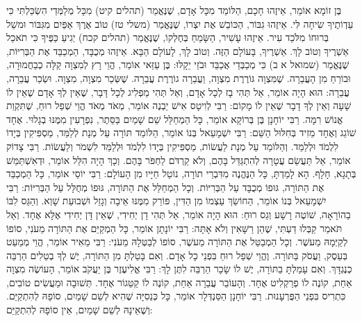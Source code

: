 בֶּן זוֹמָא אוֹמֵר, אֵיזֶהוּ חָכָם, הַלּוֹמֵד מִכָּל אָדָם, שֶׁנֶּאֱמַר (תהלים קיט) מִכָּל מְלַמְּדַי הִשְׂכַּלְתִּי כִּי עֵדְוֹתֶיךָ שִׂיחָה לִּי. אֵיזֶהוּ גִבּוֹר, הַכּוֹבֵשׁ אֶת יִצְרוֹ, שֶׁנֶּאֱמַר (משלי טז) טוֹב אֶרֶךְ אַפַּיִם מִגִּבּוֹר וּמשֵׁל בְּרוּחוֹ מִלֹּכֵד עִיר. אֵיזֶהוּ עָשִׁיר, הַשָּׂמֵחַ בְּחֶלְקוֹ, שֶׁנֶּאֱמַר (תהלים קכח) יְגִיעַ כַּפֶּיךָ כִּי תֹאכֵל אַשְׁרֶיךָ וְטוֹב לָךְ. אַשְׁרֶיךָ, בָּעוֹלָם הַזֶּה. וְטוֹב לָךְ, לָעוֹלָם הַבָּא. אֵיזֶהוּ מְכֻבָּד, הַמְכַבֵּד אֶת הַבְּרִיּוֹת, שֶׁנֶּאֱמַר (שמואל א ב) כִּי מְכַבְּדַי אֲכַבֵּד וּבֹזַי יֵקָלּוּ:
בֶּן עַזַּאי אוֹמֵר, הֱוֵי רָץ לְמִצְוָה קַלָּה כְבַחֲמוּרָה, וּבוֹרֵחַ מִן הָעֲבֵרָה. שֶׁמִּצְוָה גּוֹרֶרֶת מִצְוָה, וַעֲבֵרָה גוֹרֶרֶת עֲבֵרָה. שֶׁשְּׂכַר מִצְוָה, מִצְוָה. וּשְׂכַר עֲבֵרָה, עֲבֵרָה:
הוּא הָיָה אוֹמֵר, אַל תְּהִי בָז לְכָל אָדָם, וְאַל תְּהִי מַפְלִיג לְכָל דָּבָר, שֶׁאֵין לְךָ אָדָם שֶׁאֵין לוֹ שָׁעָה וְאֵין לְךָ דָבָר שֶׁאֵין לוֹ מָקוֹם:
רַבִּי לְוִיטָס אִישׁ יַבְנֶה אוֹמֵר, מְאֹד מְאֹד הֱוֵי שְׁפַל רוּחַ, שֶׁתִּקְוַת אֱנוֹשׁ רִמָּה. רַבִּי יוֹחָנָן בֶּן בְּרוֹקָא אוֹמֵר, כָּל הַמְחַלֵּל שֵׁם שָׁמַיִם בַּסֵּתֶר, נִפְרָעִין מִמֶּנּוּ בְגָלוּי. אֶחָד שׁוֹגֵג וְאֶחָד מֵזִיד בְּחִלּוּל הַשֵּׁם:
רַבִּי יִשְׁמָעֵאל בְּנוֹ אוֹמֵר, הַלּוֹמֵד תּוֹרָה עַל מְנָת לְלַמֵּד, מַסְפִּיקִין בְּיָדוֹ לִלְמֹד וּלְלַמֵּד. וְהַלּוֹמֵד עַל מְנָת לַעֲשׂוֹת, מַסְפִּיקִין בְּיָדוֹ לִלְמֹד וּלְלַמֵּד לִשְׁמֹר וְלַעֲשׂוֹת. רַבִּי צָדוֹק אוֹמֵר, אַל תַּעֲשֵׂם עֲטָרָה לְהִתְגַּדֵּל בָּהֶם, וְלֹא קַרְדֹּם לַחְפֹּר בָּהֶם. וְכָךְ הָיָה הִלֵּל אוֹמֵר, וּדְאִשְׁתַּמֵּשׁ בְּתָגָא, חָלָף. הָא לָמַדְתָּ, כָּל הַנֶּהֱנֶה מִדִּבְרֵי תוֹרָה, נוֹטֵל חַיָּיו מִן הָעוֹלָם:
רַבִּי יוֹסֵי אוֹמֵר, כָּל הַמְכַבֵּד אֶת הַתּוֹרָה, גּוּפוֹ מְכֻבָּד עַל הַבְּרִיּוֹת. וְכָל הַמְחַלֵּל אֶת הַתּוֹרָה, גּוּפוֹ מְחֻלָּל עַל הַבְּרִיּוֹת:
רַבִּי יִשְׁמָעֵאל בְּנוֹ אוֹמֵר, הַחוֹשֵׂךְ עַצְמוֹ מִן הַדִּין, פּוֹרֵק מִמֶּנּוּ אֵיבָה וְגָזֵל וּשְׁבוּעַת שָׁוְא. וְהַגַּס לִבּוֹ בַהוֹרָאָה, שׁוֹטֶה רָשָׁע וְגַס רוּחַ:
הוּא הָיָה אוֹמֵר, אַל תְּהִי דָן יְחִידִי, שֶׁאֵין דָּן יְחִידִי אֶלָּא אֶחָד. וְאַל תֹּאמַר קַבְּלוּ דַעְתִּי, שֶׁהֵן רַשָּׁאִין וְלֹא אָתָּה:
רַבִּי יוֹנָתָן אוֹמֵר, כָּל הַמְקַיֵּם אֶת הַתּוֹרָה מֵעֹנִי, סוֹפוֹ לְקַיְּמָהּ מֵעשֶׁר. וְכָל הַמְבַטֵּל אֶת הַתּוֹרָה מֵעשֶׁר, סוֹפוֹ לְבַטְּלָהּ מֵעֹנִי:
רַבִּי מֵאִיר אוֹמֵר, הֱוֵי מְמַעֵט בְּעֵסֶק, וַעֲסֹק בַּתּוֹרָה. וֶהֱוֵי שְׁפַל רוּחַ בִּפְנֵי כָל אָדָם. וְאִם בָּטַלְתָּ מִן הַתּוֹרָה, יֶשׁ לְךָ בְטֵלִים הַרְבֵּה כְנֶגְדָּךְ. וְאִם עָמַלְתָּ בַתּוֹרָה, יֶשׁ לוֹ שָׂכָר הַרְבֵּה לִתֶּן לָךְ:
רַבִּי אֱלִיעֶזֶר בֶּן יַעֲקֹב אוֹמֵר, הָעוֹשֶׂה מִצְוָה אַחַת, קוֹנֶה לוֹ פְרַקְלִיט אֶחָד. וְהָעוֹבֵר עֲבֵרָה אַחַת, קוֹנֶה לוֹ קַטֵּגוֹר אֶחָד. תְּשׁוּבָה וּמַעֲשִׂים טוֹבִים, כִּתְרִיס בִּפְנֵי הַפֻּרְעָנוּת. רַבִּי יוֹחָנָן הַסַּנְדְּלָר אוֹמֵר, כָּל כְּנֵסִיָּה שֶׁהִיא לְשֵׁם שָׁמַיִם, סוֹפָהּ לְהִתְקַיֵּם. וְשֶׁאֵינָהּ לְשֵׁם שָׁמַיִם, אֵין סוֹפָהּ לְהִתְקַיֵּם:
